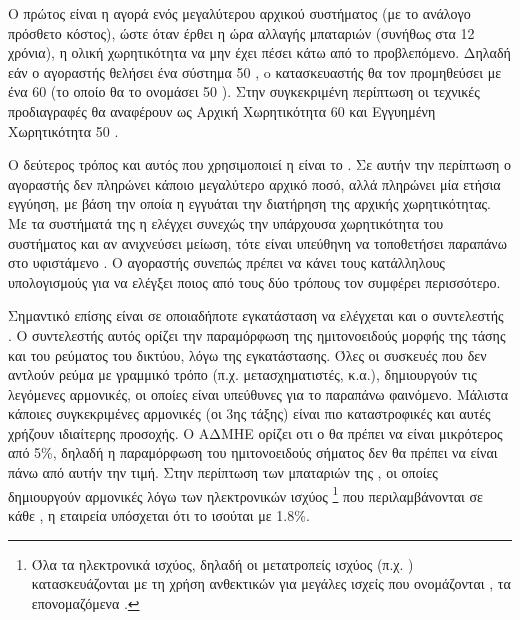 \documentclass[12pt]{report}
\begin{document}
Ο πρώτος είναι η αγορά ενός μεγαλύτερου αρχικού συστήματος (με το ανάλογο πρόσθετο κόστος), ώστε όταν έρθει η ώρα αλλαγής μπαταριών (συνήθως στα 12 χρόνια), η ολική χωρητικότητα να μην έχει πέσει κάτω από το προβλεπόμενο. 
Δηλαδή εάν ο αγοραστής θελήσει ένα σύστημα 50 {}, o κατασκευαστής θα τον προμηθεύσει με ένα 60 {} (το οποίο θα το ονομάσει 50 {}). Στην συγκεκριμένη περίπτωση οι τεχνικές προδιαγραφές 
θα αναφέρουν ως Αρχική Χωρητικότητα 60 {} και Εγγυημένη Χωρητικότητα 50 {}.

Ο δεύτερος τρόπος και αυτός που χρησιμοποιεί η {} είναι το {}. Σε αυτήν την περίπτωση ο αγοραστής δεν πληρώνει κάποιο μεγαλύτερο αρχικό ποσό, αλλά
πληρώνει μία ετήσια εγγύηση, με βάση την οποία η {} εγγυάται την διατήρηση της αρχικής χωρητικότητας. Με τα συστήματά της η {} ελέγχει συνεχώς την υπάρχουσα χωρητικότητα του συστήματος
και αν ανιχνεύσει μείωση, τότε είναι υπεύθηνη να τοποθετήσει παραπάνω {} στο υφιστάμενο {}. Ο αγοραστής συνεπώς πρέπει να κάνει τους κατάλληλους υπολογισμούς για να ελέγξει 
ποιος από τους δύο τρόπους τον συμφέρει περισσότερο.

Σημαντικό επίσης είναι σε οποιαδήποτε εγκατάσταση να ελέγχεται και ο συντελεστής {}. Ο συντελεστής αυτός ορίζει την παραμόρφωση της ημιτονοειδούς μορφής της τάσης και του ρεύματος του
δικτύου, λόγω της εγκατάστασης. Όλες οι συσκευές που δεν αντλούν ρεύμα με γραμμικό τρόπο (π.χ. μετασχηματιστές, {} κ.α.), δημιουργούν τις λεγόμενες αρμονικές, οι οποίες είναι υπεύθυνες για το παραπάνω
φαινόμενο. Μάλιστα κάποιες συγκεκριμένες αρμονικές (οι 3ης τάξης) είναι πιο καταστροφικές και αυτές χρήζουν ιδιαίτερης προσοχής. Ο ΑΔΜΗΕ ορίζει οτι ο {} θα πρέπει να είναι μικρότερος από 5\%, δηλαδή η παραμόρφωση
του ημιτονοειδούς σήματος δεν θα πρέπει να είναι πάνω από αυτήν την τιμή. Στην περίπτωση των μπαταριών της {}, οι οποίες δημιουργούν αρμονικές λόγω των ηλεκτρονικών ισχύος
\footnote{Όλα τα ηλεκτρονικά ισχύος, δηλαδή οι μετατροπείς ισχύος (π.χ. {}) κατασκευάζονται με τη χρήση ανθεκτικών για μεγάλες ισχείς {} που ονομάζονται {}, 
τα επονομαζόμενα {}.} που περιλαμβάνονται σε κάθε {}, η εταιρεία υπόσχεται ότι το {} ισούται με 1.8\%.
\end{document}
